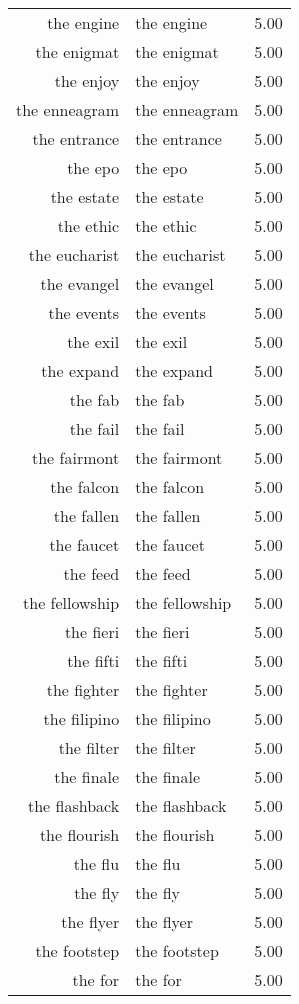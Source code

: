 \begin{table}[ht]
\begin{tabular}{rlr}
  the engine & the engine & 5.00 \\ 
  the enigmat & the enigmat & 5.00 \\ 
  the enjoy & the enjoy & 5.00 \\ 
  the enneagram & the enneagram & 5.00 \\ 
  the entrance & the entrance & 5.00 \\ 
  the epo & the epo & 5.00 \\ 
  the estate & the estate & 5.00 \\ 
  the ethic & the ethic & 5.00 \\ 
  the eucharist & the eucharist & 5.00 \\ 
  the evangel & the evangel & 5.00 \\ 
  the events & the events & 5.00 \\ 
  the exil & the exil & 5.00 \\ 
  the expand & the expand & 5.00 \\ 
  the fab & the fab & 5.00 \\ 
  the fail & the fail & 5.00 \\ 
  the fairmont & the fairmont & 5.00 \\ 
  the falcon & the falcon & 5.00 \\ 
  the fallen & the fallen & 5.00 \\ 
  the faucet & the faucet & 5.00 \\ 
  the feed & the feed & 5.00 \\ 
  the fellowship & the fellowship & 5.00 \\ 
  the fieri & the fieri & 5.00 \\ 
  the fifti & the fifti & 5.00 \\ 
  the fighter & the fighter & 5.00 \\ 
  the filipino & the filipino & 5.00 \\ 
  the filter & the filter & 5.00 \\ 
  the finale & the finale & 5.00 \\ 
  the flashback & the flashback & 5.00 \\ 
  the flourish & the flourish & 5.00 \\ 
  the flu & the flu & 5.00 \\ 
  the fly & the fly & 5.00 \\ 
  the flyer & the flyer & 5.00 \\ 
  the footstep & the footstep & 5.00 \\ 
  the for & the for & 5.00 \\ 

\end{tabular}
\end{table}
